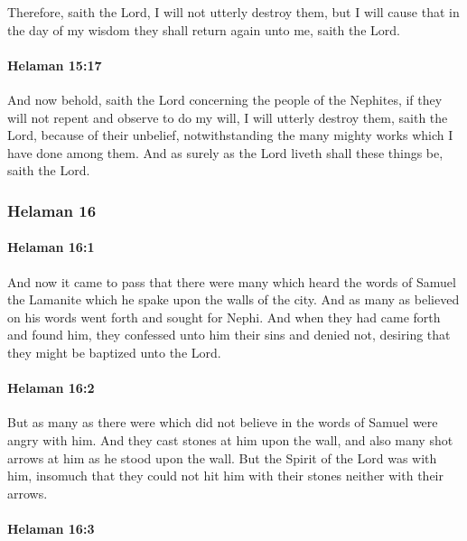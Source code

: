 			Therefore, saith the Lord, I will not utterly destroy them,
			but I will cause that in the day of my wisdom
			they shall return again unto me, saith the Lord.

		\paragraph{Helaman 15:17} %
			\label{HELAMAN-15-17}

			And now behold, saith the Lord concerning the people of the Nephites,
			if they will not repent and observe to do my will,
			I will utterly destroy them, saith the Lord, because of their unbelief,
			notwithstanding the many mighty works which I have done among them.
			And as surely as the Lord liveth shall these things be, saith the Lord.
	
	\subsubsection{Helaman 16} %
		\label{HELAMAN-16}
		
		\paragraph{Helaman 16:1} %
			\label{HELAMAN-16-1}

			And now it came to pass that
			there were many which heard the words of Samuel the Lamanite
			which he spake upon the walls of the city.
			And as many as believed on his words went forth and sought for Nephi.
			And when they had came forth and found him,
			they confessed unto him their sins and denied not,
			desiring that they might be baptized unto the Lord.

		\paragraph{Helaman 16:2} %
			\label{HELAMAN-16-2}

			But as many as there were
			which did not believe in the words of Samuel
			were angry with him.
			And they cast stones at him upon the wall,
			and also many shot arrows at him as he stood upon the wall.
			But the Spirit of the Lord was with him,
			insomuch that they could not hit him with their stones neither with their arrows.

		\paragraph{Helaman 16:3} %
			\label{HELAMAN-16-3}

